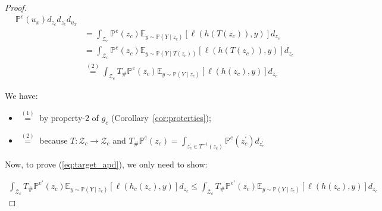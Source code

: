\begin{proof}
\begin{align}
 \mathbb{P}^{e}(u_x) d_{z_c} d_{z_e}  d_{u_x}\nonumber\\
&=
\int_{\mathcal{Z}_c}\mathbb{P}^{e}(z_c)\mathbb{E}_{y\sim\mathbb{P}(Y\mid z_c)} \left[ \ell\left(h\left(T(z_c)\right),y\right)\right]
 d_{z_c} \nonumber\\
&= 
\int_{\mathcal{Z}_c}\mathbb{P}^{e}(z_c)\mathbb{E}_{y\sim\mathbb{P}(Y\mid T(z_c))} \left[ \ell\left(h\left(T(z_c)\right),y\right)\right]
 d_{z_c} \nonumber
\\
&\stackrel{(2)}{=} 
\int_{\mathcal{Z}_c}T_{\#}\mathbb{P}^{e}(z_c)\mathbb{E}_{y\sim\mathbb{P}(Y\mid z_c)} \left[ \ell\left(h\left(z_c\right),y\right)\right]
 d_{z_c} \nonumber
\end{align}

We have:
\begin{itemize}
    \item $\stackrel{(1)}{=}$ by property-2 of $g_c$ (Corollary~\ref{cor:proterties});
    \item $\stackrel{(2)}{=}$ because $T: \mathcal{Z}_c\rightarrow \mathcal{Z}_c$ and  $T_{\#}\mathbb{P}^{e}(z_c)=\int_{z^{'}_c\in T^{-1}(z_c)}\mathbb{P}^{e}(z^{'}_c)d_{z^{'}_c}$ 
\end{itemize} 

Now, to prove (\ref{eq:target_apd}), we only need to show:


\begin{align}
\int_{\mathcal{Z}_c}T_{\#}\mathbb{P}^{e'}(z_c)\mathbb{E}_{y\sim\mathbb{P}(Y\mid z_c)} \left[ \ell\left(h_c\left(z_c\right),y\right)\right]
 d_{z_c}\leq\int_{\mathcal{Z}_c}T_{\#}\mathbb{P}^{e'}(z_c)\mathbb{E}_{y\sim\mathbb{P}(Y\mid z_c)} \left[ \ell\left(h\left(z_c\right),y\right)\right]
 d_{z_c}
 \label{eq:target_causal}
\end{align}




\end{proof}

